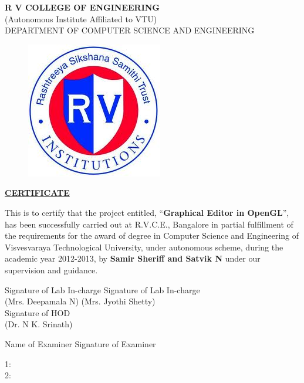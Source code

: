 \documentclass[12pt]{report}
\begin{document}
\begin{titlepage}
\newpage
\begin{center}
{\bfseries\large R V COLLEGE OF ENGINEERING}\\
{\normalsize (Autonomous Institute Affiliated to VTU)}\\
{\normalsize DEPARTMENT OF COMPUTER SCIENCE AND ENGINEERING}\\
\end{center}
	
\begin{figure}[h!]
	\centering
		\includegraphics[scale=0.5]{RVCE.png}
\end{figure}

\begin{center}
\bf{\underline{CERTIFICATE}}
\end{center}
\noindent This is to certify that the project entitled, ``\textbf{Graphical Editor in OpenGL}'',  has been successfully carried out at R.V.C.E., Bangalore
 in partial fulfillment of the requirements for the award of degree 
 in Computer Science and Engineering of Visvesvaraya Technological University, under autonomous scheme, during the academic year 2012-2013, 
by  \textbf{Samir Sheriff and Satvik N}  under our supervision and guidance.
\vspace{.5in}

\begin{flushleft} 
 Signature of Lab In-charge  \hspace{4cm} Signature of Lab In-charge \\
 (Mrs. Deepamala N) \hspace{6cm} (Mrs. Jyothi Shetty)\\
\vspace{0.75 in}
\hspace{10cm}
 Signature of HOD	
\\ \hspace{10cm} (Dr. N K. Srinath) \\

 \end{flushleft} 
\begin{flushleft}
\hspace{1in}Name of Examiner \hspace{1.25in} Signature of Examiner
\end{flushleft}
\begin{flushleft}
1: \\
\vspace{.5in} 
2: 
\end{flushleft}
\end{titlepage}
\end{document}
